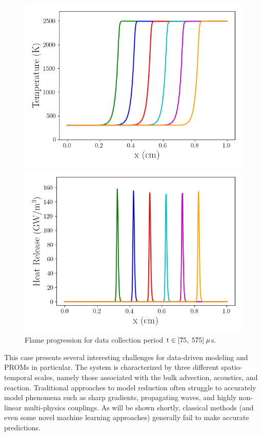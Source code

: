 \begin{figure}
	\begin{minipage}{0.49\linewidth}
		\includegraphics[width=0.99\linewidth]{Chapters/TransientFlame/Images/fom/fom_temp_snaps.png}
	\end{minipage}
	\begin{minipage}{0.49\linewidth}
		\includegraphics[width=0.99\linewidth]{Chapters/TransientFlame/Images/fom/fom_hr_snaps.png}
	\end{minipage}
	\caption{\label{fig:flameFOMFlame}Flame progression for data collection period $\text{t} \in [75, \; 575] \; \mu$s.}
\end{figure}

This case presents several interesting challenges for data-driven modeling and PROMs in particular. The system is characterized by three different spatio-temporal scales, namely those associated with the bulk advection, acoustics, and reaction. Traditional approaches to model reduction often struggle to accurately model phenomena such as sharp gradients, propagating waves, and highly non-linear multi-physics couplings. As will be shown shortly, classical methods (and even some novel machine learning approaches) generally fail to make accurate predictions.